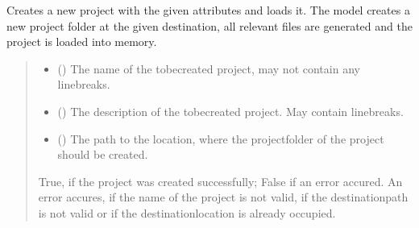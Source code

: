 \documentclass[letterpaper,10pt,english]{sphinxmanual}
\begin{document}
\begin{fulllineitems}
\begin{fulllineitems}
\label{\detokenize{apidoc/src.osm_configurator.control:src.osm_configurator.control.project_controller.ProjectController.create_project}}
\pysigstartsignatures
{}
\pysigstopsignatures
\sphinxAtStartPar
Creates a new project with the given attributes and loads it.
The model creates a new project folder at the given destination, all relevant files are generated and the project is loaded into memory.
\begin{quote}\begin{description}
\begin{itemize}
\item {} 
\sphinxAtStartPar
{} () \textendash{} The name of the to\sphinxhyphen{}be\sphinxhyphen{}created project, may not contain any line\sphinxhyphen{}breaks.

\item {} 
\sphinxAtStartPar
{} () \textendash{} The description of the to\sphinxhyphen{}be\sphinxhyphen{}created project. May contain line\sphinxhyphen{}breaks.

\item {} 
\sphinxAtStartPar
{} () \textendash{} The path to the location, where the projectfolder of the project should be created.

\end{itemize}

\sphinxAtStartPar
True, if the project was created successfully; False if an error accured. An error accures, if the name of the project is not valid, if the destination\sphinxhyphen{}path is not valid or if the destination\sphinxhyphen{}location is already occupied.

\sphinxAtStartPar
{}


\end{description}
\end{quote}
\end{fulllineitems}
\end{fulllineitems}
\end{document}
